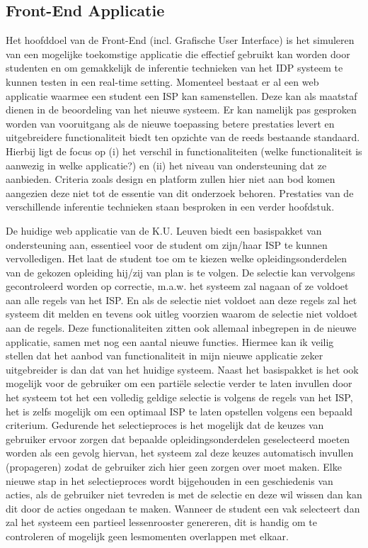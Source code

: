 \subsection{Front-End Applicatie} 
Het hoofddoel van de Front-End (incl. Grafische User Interface) is het simuleren van een mogelijke toekomstige applicatie die effectief gebruikt kan worden door studenten en om gemakkelijk de inferentie technieken van het IDP systeem te kunnen testen in een real-time setting. Momenteel bestaat er al een web applicatie waarmee een student een ISP kan samenstellen. Deze kan als maatstaf dienen in de beoordeling van het nieuwe systeem. Er kan namelijk pas gesproken worden van vooruitgang als de nieuwe toepassing betere prestaties levert en uitgebreidere functionaliteit biedt ten opzichte van de reeds bestaande standaard. Hierbij ligt de focus op (i) het verschil in functionaliteiten (welke functionaliteit is aanwezig in welke applicatie?) en (ii) het niveau van ondersteuning dat ze aanbieden. Criteria zoals design en platform zullen hier niet aan bod komen aangezien deze niet tot de essentie van dit onderzoek behoren. Prestaties van de verschillende inferentie technieken staan besproken in een verder hoofdstuk. 

De huidige web applicatie van de K.U. Leuven biedt een basispakket van ondersteuning aan, essentieel voor de student om zijn/haar ISP te kunnen vervolledigen. Het laat de student toe om te kiezen welke opleidingsonderdelen van de gekozen opleiding hij/zij van plan is te volgen. De selectie kan vervolgens gecontroleerd worden op correctie, m.a.w. het systeem zal nagaan of ze voldoet aan alle regels van het ISP. En als de selectie niet voldoet aan deze regels zal het systeem dit melden en tevens ook uitleg voorzien waarom de selectie niet voldoet aan de regels. Deze functionaliteiten zitten ook allemaal inbegrepen in de nieuwe applicatie, samen met nog een aantal nieuwe functies. Hiermee kan ik veilig stellen dat het aanbod van functionaliteit in mijn nieuwe applicatie zeker uitgebreider is dan dat van het huidige systeem. 
Naast het basispakket is het ook mogelijk voor de gebruiker om een parti\"{e}le selectie verder te laten invullen door het systeem tot het een volledig geldige selectie is volgens de regels van het ISP, het is zelfs mogelijk om een optimaal ISP te laten opstellen volgens een bepaald criterium. Gedurende het selectieproces is het mogelijk dat de keuzes van gebruiker ervoor zorgen dat bepaalde opleidingsonderdelen geselecteerd moeten worden als een gevolg hiervan, het systeem zal deze keuzes automatisch invullen (propageren) zodat de gebruiker zich hier geen zorgen over moet maken. Elke nieuwe stap in het selectieproces wordt bijgehouden in een geschiedenis van acties, als de gebruiker niet tevreden is met de selectie en deze wil wissen dan kan dit door de acties ongedaan te maken. Wanneer de student een vak selecteert dan zal het systeem een partieel lessenrooster genereren, dit is handig om te controleren of mogelijk geen lesmomenten overlappen met elkaar. 

